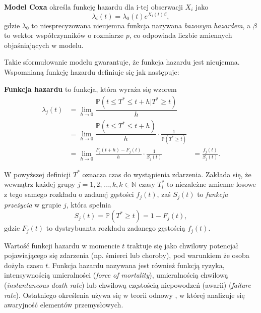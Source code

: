 \begin{definition}
\textbf{Model Coxa} określa funkcję hazardu dla i-tej obserwacji $X_i$ jako
\begin{equation}
\lambda_i(t) = \lambda_0(t)e^{X_i(t)\beta},
\end{equation}
gdzie $\lambda_0$ to niesprecyzowana nieujemna funkcja nazywana \textit{bazowym hazardem}, a $\beta$ to wektor współczynników o rozmiarze $p$, co odpowiada liczbie zmiennych objaśniających w modelu.
\end{definition}

Takie sformułowanie modelu gwarantuje, że funkcja hazardu jest nieujemna. Wspomnianą funkcję hazardu definiuje się jak następuje:
\begin{definition}
\textbf{Funkcja hazardu} to funkcja, która wyraża się wzorem
\begin{equation}
\begin{align*}
\lambda_j(t) & =  \lim\limits_{h\rightarrow 0}\dfrac{\mathbb{P}(t \leq T^* \leq t +h | T^* \geq t)}{h} & \ \\
 \ & = \lim\limits_{h\rightarrow 0}\dfrac{\mathbb{P}(t \leq T^* \leq t +h )}{h}\cdot\frac{1}{  \mathbb{P}(T^* \geq t)} & \ \\ \ & = \lim\limits_{h\rightarrow 0} \frac{F_j(t+h) - F_j(t) }{h}\cdot\frac{1}{S_j(t)} & =  \frac{f_j(t)}{S_j(t)}.
\end{align*}
\end{equation}
\end{definition}

W powyższej definicji $T^*$ oznacza czas do wystąpienia zdarzenia. Zakłada się, że wewnątrz każdej grupy $j=1,2,\dots, k, k \in \mathbb{N}$ czasy $T_i^*$ to niezależne zmienne losowe z tego samego rozkładu o zadanej gęstości $f_j(t)$, zaś $S_j(t)$ to \textit{funkcja przeżycia} w grupie $j$, która spełnia 
\begin{equation}
S_j(t) = \mathbb{P}(T^* \geq t )  = 1 - F_j(t), 
\end{equation}
gdzie $F_j(t)$ to dystrybuanta rozkładu zadanego gęstością $f_j(t)$.


Wartość funkcji hazardu w momencie $t$ traktuje się jako chwilowy potencjał pojawiającego się zdarzenia (np. śmierci lub choroby), pod warunkiem że osoba dożyła czasu $t$. Funkcja hazardu nazywana jest również funkcją ryzyka,
intensywnością umieralności (\textit{force of mortality}), umieralnością
chwilową (\textit{instantaneous death rate}) lub chwilową
częstością niepowodzeń (awarii) (\textit{failure rate}). Ostatniego
określenia używa się w teorii odnowy \cite{cox0}, w której analizuje
się awaryjność elementów przemysłowych. 


